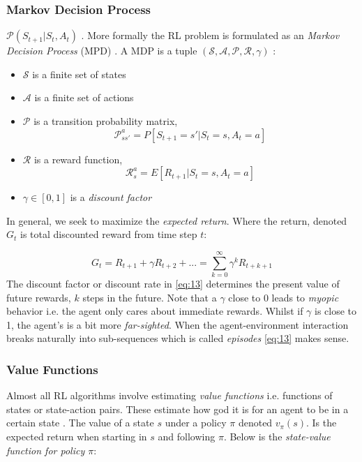 \documentclass{kththesis}
\theoremstyle{definition}
\begin{document}
\subsubsection*{Markov Decision Process}
$\mathcal{P}(S_{t+1} |S_t, A_t)$ \parencite{li2017deep}. More formally the RL problem is formulated as an \textit{Markov Decision Process} (MPD) \parencite{sutton1998reinforcement, li2017deep}. A MDP is a tuple $(\mathcal{S, A, P, R}, \gamma)$ \parencite{li2017deep}:
\begin{itemize}
    \item $\mathcal{S}$ is a finite set of states
    \item $\mathcal{A}$ is a finite set of actions
    \item $\mathcal{P}$ is a transition probability matrix, 
    \begin{equation} 
        \label{eq:12a}
        \mathcal{P}^{a}_{ss'} = P[S_{t+1} = s' | S_t =s, A_t = a]
    \end{equation}
    \item $\mathcal{R}$ is a reward function, 
    \begin{equation}
        \label{eq:12b}
        \mathcal{R}^{a}_{s} = E[R_{t+1} | S_t =s, A_t=a]
    \end{equation}
    \item $\gamma \in [0,1]$ is a \textit{discount factor} 
\end{itemize}
In general, we seek to maximize the \textit{expected return}. Where the return, denoted $G_t$ is total discounted reward from time step $t$:

\begin{equation}
    \label{eq:13}
    G_t = R_{t+1} + \gamma R_{t+2} + ... = \sum_{k=0}^{\infty}{\gamma^{k}R_{t+k+1}}
\end{equation}
The discount factor or discount rate in \autoref{eq:13} determines the present value of future rewards, $k$ steps in the future. Note that a $\gamma$ close to 0 leads to \textit{myopic} behavior i.e. the agent only cares about immediate rewards. Whilst if $\gamma$ is close to 1, the agent's is a bit more \textit{far-sighted}. When the agent-environment interaction breaks naturally into sub-sequences which is called \textit{episodes}
\autoref{eq:13} makes sense. 

\subsubsection*{Value Functions}

Almost all RL algorithms involve estimating \textit{value functions} i.e. functions of states or state-action pairs. These estimate how god it is for an agent to be in a certain state \parencite{sutton1998reinforcement, li2017deep}. The value of a state $s$ under a policy $\pi$ denoted $v_{\pi}(s)$. Is the expected return when starting in $s$ and following $\pi$. Below is the \textit{state-value function for policy $\pi$}:
\end{document}
